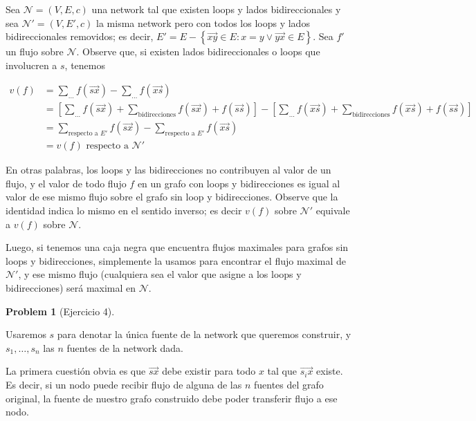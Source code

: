 \documentclass[a4paper, 12pt]{article}
\newtheorem{problem}{Problem}
\newtheorem{problem}{Problem}
\begin{document}
    Sea $\mathcal{N} = (V, E, c)$ una network tal que existen loops y lados
    bidireccionales y sea $\mathcal{N}' = (V, E', c)$ la misma network pero con todos los
    loops y lados bidireccionales removidos; es decir, $E' = E - \left\{
    \overrightarrow{xy} \in E : x = y \lor \overrightarrow{yx} \in E \right\} $.
    Sea $f'$ un flujo sobre $\mathcal{N}$. Observe que, si existen lados
    bidireccionales o loops que involucren a $s$, tenemos 

    \begin{align*}
        v(f) &= \sum_{\ldots} f(\overrightarrow{sx}) -
        \sum_{\ldots}f(\overrightarrow{xs}) \\ 
             &= \left[ \sum_{\ldots} f(\overrightarrow{sx}) +
                 \sum_{\text{bidirecciones}} f(\overrightarrow{sx}) +
                 f(\overrightarrow{ss}) \right] - \left[  \sum_{\ldots}
             f(\overrightarrow{xs}) + \sum_{\text{bidirecciones}} f(\overrightarrow{xs})+  f(\overrightarrow{ss}) \right] \\ 
             &= \sum_{\text{respecto a } E'} f(\overrightarrow{sx}) -
             \sum_{\text{respecto a } E'}f(\overrightarrow{xs}) \\ 
             &=v(f) \text{ respecto a  } \mathcal{N}'
    \end{align*}

En otras palabras, los loops y las bidirecciones no contribuyen al valor de un
flujo, y el valor de todo flujo $f$ en un grafo con loops y bidirecciones es
igual al valor de ese mismo flujo sobre el grafo sin loop y bidirecciones.
Observe que la identidad indica lo mismo en el sentido inverso; es decir $v(f)$
sobre $\mathcal{N}'$ equivale a $v(f)$ sobre $\mathcal{N}$.

Luego, si tenemos una caja negra que encuentra flujos maximales para grafos sin
loops y bidirecciones, simplemente la usamos para encontrar el flujo maximal de
$\mathcal{N}'$, y ese mismo flujo (cualquiera sea el valor que asigne a los
loops y bidirecciones) será maximal en $\mathcal{N}$.

\begin{problem}[Ejercicio 4]
    
\end{problem}

Usaremos $s$ para denotar la única fuente de la network que queremos construir,
y $s_1, \ldots, s_n$ las $n$ fuentes de la network dada. 

La primera cuestión obvia es que $\overrightarrow{sx}$ debe existir para todo
$x $ tal que $\overrightarrow{s_i x}$ existe. Es decir, si un nodo puede recibir
flujo de alguna de las $n$ fuentes del grafo original, la fuente de nuestro
grafo construido debe poder transferir flujo a ese nodo.
\end{document}
